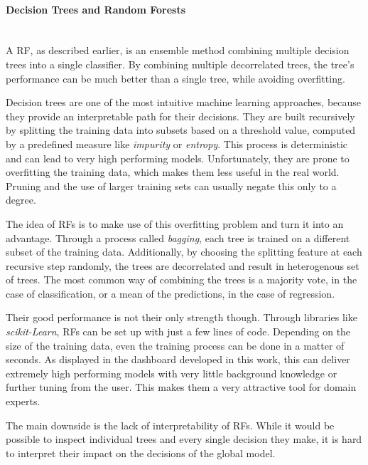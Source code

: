\documentclass[a4paper, 12pt]{article}
\begin{document}
\paragraph{Decision Trees and Random Forests}\mbox{}\\
A RF, as described earlier, is an ensemble method combining multiple decision trees into a
single classifier. By combining multiple decorrelated trees, the tree's performance can be
much better than a single tree, while avoiding overfitting.
\par
Decision trees are one of the most intuitive machine learning approaches, because they
provide an interpretable path for their decisions. They are built recursively by splitting
the training data into subsets based on a threshold value, computed by a predefined measure
like \textit{impurity} or \textit{entropy}. This process is deterministic and can lead to
very high performing models. Unfortunately, they are prone to overfitting the training data,
which makes them less useful in the real world. Pruning and the use of larger training
sets can usually negate this only to a degree. \par

The idea of RFs is to make use of this overfitting problem and turn it into an advantage.
Through a process called \textit{bagging}, each tree is trained on a different subset of the
training data. Additionally, by choosing the splitting feature at each recursive step
randomly, the trees are decorrelated and result in heterogenous set of trees. The most
common way of combining the trees is a majority vote, in the case of classification, or a
mean of the predictions, in the case of regression. \par

Their good performance is not their only strength though. Through libraries like
\textit{scikit-Learn}, RFs can be set up with just a few lines of code. Depending on the size
of the training data, even the training process can be done in a matter of seconds. As
displayed in the dashboard developed in this work, this can deliver extremely high performing
models with very little background knowledge or further tuning from the user. This makes them
a very attractive tool for domain experts. \par

The main downside is the lack of interpretability of RFs. While it would be possible to inspect
individual trees and every single decision they make, it is hard to interpret their impact on
the decisions of the global model.
\end{document}
